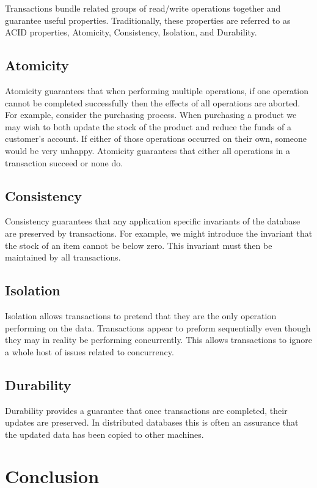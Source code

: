 Transactions bundle related groups of read/write operations together and guarantee useful properties.
Traditionally, these properties are referred to as ACID properties, Atomicity, Consistency, Isolation, and Durability.

\subsection{Atomicity}
Atomicity guarantees that when performing multiple operations,
if one operation cannot be completed successfully then the effects of all operations are aborted.
For example, consider the purchasing process.
When purchasing a product we may wish to both update the stock of the product and reduce the funds of a customer's account.
If either of those operations occurred on their own,
someone would be very unhappy.
Atomicity guarantees that either all operations in a transaction succeed or none do.

\subsection{Consistency}
Consistency guarantees that any application specific invariants of the database are preserved by transactions.
For example, we might introduce the invariant that the stock of an item cannot be below zero.
This invariant must then be maintained by all transactions.

\subsection{Isolation}
Isolation allows transactions to pretend that they are the only operation performing on the data.
Transactions appear to preform sequentially even though they may in reality be performing concurrently.
This allows transactions to ignore a whole host of issues related to concurrency.

\subsection{Durability}
Durability provides a guarantee that once transactions are completed,
their updates are preserved.
In distributed databases this is often an assurance that the updated data has been copied to other machines.

\section{Conclusion}

